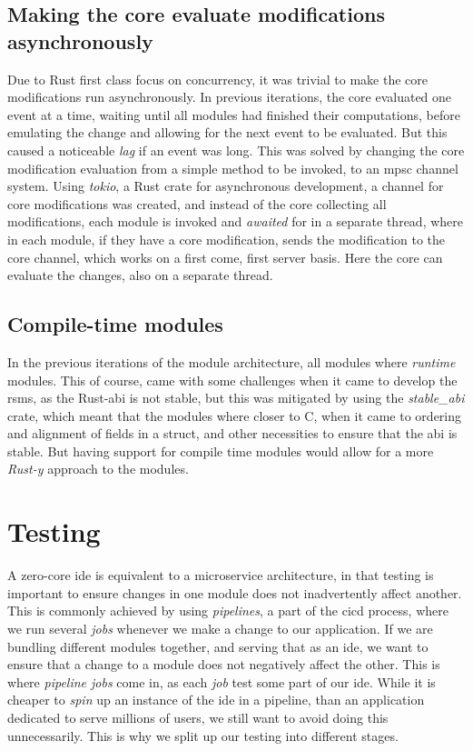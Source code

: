\subsection{Making the core evaluate modifications asynchronously}

Due to Rust first class focus on concurrency, it was trivial to make the core
modifications run asynchronously. In previous iterations, the core evaluated
one event at a time, waiting until all modules had finished their computations,
before emulating the change and allowing for the next event to be evaluated. But
this caused a noticeable \textit{lag} if an event was long. This was solved by
changing the core modification evaluation from a simple method to be invoked, to
an \gls*{mpsc} channel system. Using \textit{tokio}, a Rust crate for
asynchronous development, a channel for core modifications was created, and
instead of the core collecting all modifications, each module is invoked and
\textit{awaited} for in a separate thread, where in each module, if they have a
core modification, sends the modification to the core channel, which works on
a first come, first server basis. Here the core can evaluate the changes, also
on a separate thread.

\subsection{Compile-time modules}

In the previous iterations of the module architecture, all modules where
\textit{runtime} modules. This of course, came with some challenges when it came
to develop the \gls*{rsms}, as the Rust-\gls*{abi} is not stable, but this was
mitigated by using the \textit{stable\_abi} crate, which meant that the modules
where closer to C, when it came to ordering and alignment of fields in a struct,
and other necessities to ensure that the \gls*{abi} is stable. But having support
for compile time modules would allow for a more \textit{Rust-y} approach to the
modules.

\section{Testing} \label{sec:testing}

A zero-core \gls*{ide} is equivalent to a microservice architecture, in that
testing is important to ensure changes in one module does not inadvertently
affect another. This is commonly achieved by using \textit{pipelines}, a part
of the \gls*{cicd} process, where we run several \textit{jobs} whenever we make a
change to our application. If we are bundling different modules together, and
serving that as an \gls*{ide}, we want to ensure that a change to a module does
not negatively affect the other. This is where \textit{pipeline jobs} come in,
as each \textit{job} test some part of our \gls*{ide}. While it is cheaper to
\textit{spin} up an instance of the \gls*{ide} in a pipeline, than an application
dedicated to serve millions of users, we still want to avoid doing this
unnecessarily. This is why we split up our testing into different stages.

